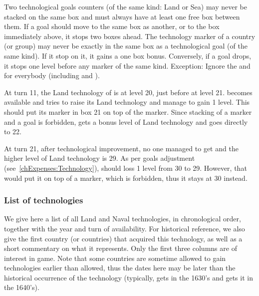  Two technological goals counters (of the same
kind: Land or Sea) may never be stacked on the same box and must always have
at least one free box between them. If a goal should move to the same box as
another, or to the box immediately above, it stops two boxes ahead.
\bparag The technology marker of a country (or group) may never be exactly in
the same box as a technological goal (of the same kind). If it stop on it, it
gains a one box bonus. Conversely, if a goal drops, it stops one level before
any marker of the same kind.
\bparag Exception: Ignore the \TTER and \TVGA for everybody (including \SPA
and \VEN).

\begin{exemple}
  At turn 11, the Land technology of \FRA is at level 20, just before \TARQ at
  level 21. \TARQ becomes available and \FRA tries to raise its Land
  technology and manage to gain 1 level. This should put its marker in box 21
  on top of the \TARQ marker. Since stacking of a marker and a goal is
  forbidden, \FRA gets a bonus level of Land technology and goes directly to
  22.

  At turn 21, after technological improvement, no one managed to get \TMUS and
  the higher level of Land technology is 29. As per goals adjustment
  (see~\ref{chExpenses:Technology}), \TMUS should loss 1 level from 30 to
  29. However, that would put it on top of a marker, which is forbidden, thus
  it stays at 30 instead.
\end{exemple}


\subsubsection{List of technologies}
\aparag We give here a list of all Land and Naval technologies, in
chronological order, together with the year and turn of availability. For
historical reference, we also give the first country (or countries) that
acquired this technology, as well as a short commentary on what it
represents. Only the first three columns are of interest in game.
\bparag Note that some countries are sometime allowed to gain technologies
earlier than allowed, thus the dates here may be later than the historical
occurrence of the technology (typically, \SUE gets \TBAR in the 1630's and
\ENG gets it in the 1640's).

